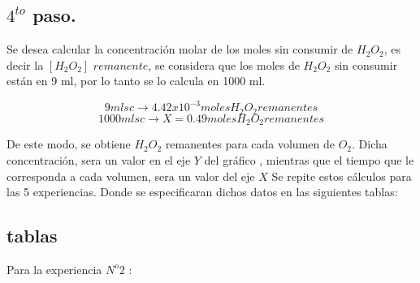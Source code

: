\documentclass[a4paper,12pt]{article}
\begin{document}
\subsection{ $4^{to}$ paso.}
Se desea calcular la concentración molar de los moles sin consumir de $H_2O_2$, es decir la $[H_2O_2]$ $remanente$, se considera que los moles de $H_2O_2$ sin consumir están en 9 ml, por lo tanto se lo calcula en 1000 ml.

$$9 ml sc\to 4.42x10^{-3}moles H_2O_2 remanentes$$
$$1000 ml sc\to X= 0.49 moles H_2O_2 remanentes$$ 

De este modo, se obtiene $H_2O_2$ remanentes para cada volumen de $O_2$. Dicha concentración, sera un valor en el eje $Y$ del gráfico , mientras que el tiempo que le corresponda a cada volumen, sera un valor del eje $X$
  Se repite estos cálculos para las 5 experiencias. Donde se especificaran dichos datos en las siguientes tablas: 

\subsection {tablas}

Para la experiencia $N^o 2$ :
\end{document}
